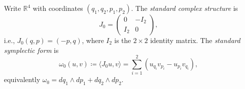 %
%



\begin{definition}\label{def:symplectic-form}
Write $\mathbb{R}^4$ with coordinates $(q_1, q_2, p_1, p_2)$.
The \emph{standard complex structure} is
\[
  J_0 = \begin{pmatrix} 0 & -I_2 \\ I_2 & 0 \end{pmatrix},
\]
i.e., $J_0(q, p) = (-p, q)$,
where $I_2$ is the $2 \times 2$ identity matrix.
The \emph{standard symplectic form} is
\[
  \omega_0(u, v) \coloneqq \langle J_0 u, v \rangle
  = \sum_{i=1}^{2} (u_{q_i} v_{p_i} - u_{p_i} v_{q_i}),
\]
equivalently $\omega_0 = dq_1 \wedge dp_1 + dq_2 \wedge dp_2$.
\end{definition}


